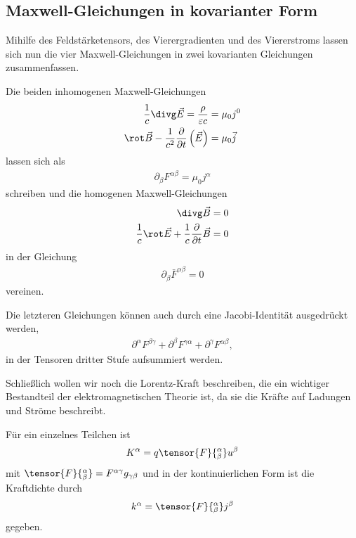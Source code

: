 \subsection{Maxwell-Gleichungen in kovarianter Form}

Mihilfe des Feldstärketensors, des Vierergradienten und des Viererstroms lassen sich nun die vier Maxwell-Gleichungen in zwei kovarianten Gleichungen zusammenfassen. 

Die beiden inhomogenen Maxwell-Gleichungen
\begin{align*}
    \frac{1}{c}\divg \vec E = \frac{\rho}{\varepsilon c}&=\mu_0 j^0 \\ 
    \rot \vec B - \frac{1}{c^2}\frac{\partial}{\partial t}\left(\vec E\right) &= \mu_0 \vec j
\end{align*}
lassen sich als 
\begin{align}
    \boxed{\partial_\beta F^{\alpha\beta}=\mu_0 j^\alpha}
\end{align}
schreiben und die homogenen Maxwell-Gleichungen 
\begin{align*}
    \divg \vec B&=0 \\
    \frac{1}{c}\rot\vec E + \frac{1}{c} \frac{\partial}{\partial t}\vec B &=0
\end{align*}
in der Gleichung 
\begin{align}
    \boxed{\partial_\beta\bar F^{\alpha\beta} = 0}
\end{align}
vereinen. 

Die letzteren Gleichungen können auch durch eine Jacobi-Identität ausgedrückt werden,
\begin{align*}
    \partial^\alpha F^{\beta\gamma} + \partial^\beta F^{\gamma\alpha} + \partial^\gamma F^{\alpha\beta},
\end{align*}
in der Tensoren dritter Stufe aufsummiert werden. 

Schließlich wollen wir noch die Lorentz-Kraft beschreiben, die ein wichtiger Bestandteil der elektromagnetischen Theorie ist, da sie die Kräfte auf Ladungen und Ströme beschreibt. 

Für ein einzelnes Teilchen ist 
\begin{align*}
    K^\alpha =q \tensor{F}{^\alpha_\beta} u^\beta
\end{align*}
mit $\tensor{F}{^\alpha_\beta} = F^{\alpha\gamma} g_{\gamma\beta}$ und in der kontinuierlichen Form ist die Kraftdichte durch
\begin{align*}
    k^\alpha = \tensor{F}{^\alpha_\beta} j^\beta
\end{align*}
gegeben. 


